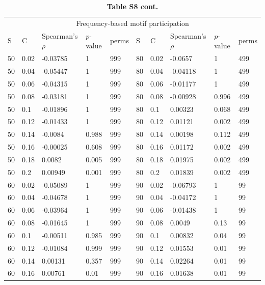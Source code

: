 \documentclass[12pt]{article}
\begin{document}
\begin{spacing}{2.0}
		\begin{table}[hb!]
			\caption*{\hspace{-13.5cm}\textbf{Table S8 cont.}}
			\footnotesize
			\begin{tabular}{l l | l l | l || ll | ll | l}
			\multicolumn{10}{c}{Frequency-based motif participation} \\
			S & C & Spearman's $\rho$ & $p$-value & perms & S & C & Spearman's $\rho$ & $p$-value & perms\\
			\hline
            50	&	0.02	&	-0.03785	&	1	&	999	&	80	&	0.02	&	-0.0657	&	1	&	499	\\
            50	&	0.04	&	-0.05447	&	1	&	999	&	80	&	0.04	&	-0.04118	&	1	&	499	\\
            50	&	0.06	&	-0.04315	&	1	&	999	&	80	&	0.06	&	-0.01177	&	1	&	499	\\
            50	&	0.08	&	-0.03181	&	1	&	999	&	80	&	0.08	&	-0.00928	&	0.996	&	499	\\
            50	&	0.1	&	-0.01896	&	1	&	999	&	80	&	0.1	&	0.00323	&	0.068	&	499	\\
            50	&	0.12	&	-0.01433	&	1	&	999	&	80	&	0.12	&	0.01121	&	0.002	&	499	\\
            50	&	0.14	&	-0.0084	&	0.988	&	999	&	80	&	0.14	&	0.00198	&	0.112	&	499	\\
            50	&	0.16	&	-0.00025	&	0.608	&	999	&	80	&	0.16	&	0.01172	&	0.002	&	499	\\
            50	&	0.18	&	0.0082	&	0.005	&	999	&	80	&	0.18	&	0.01975	&	0.002	&	499	\\
            50	&	0.2	&	0.00949	&	0.001	&	999	&	80	&	0.2	&	0.01839	&	0.002	&	499	\\
            60	&	0.02	&	-0.05089	&	1	&	999	&	90	&	0.02	&	-0.06793	&	1	&	99	\\
            60	&	0.04	&	-0.04678	&	1	&	999	&	90	&	0.04	&	-0.04172	&	1	&	99	\\
            60	&	0.06	&	-0.03964	&	1	&	999	&	90	&	0.06	&	-0.01438	&	1	&	99	\\
            60	&	0.08	&	-0.01645	&	1	&	999	&	90	&	0.08	&	0.0049	&	0.13	&	99	\\
            60	&	0.1	&	-0.00511	&	0.985	&	999	&	90	&	0.1	&	0.00832	&	0.04	&	99	\\
            60	&	0.12	&	-0.01084	&	0.999	&	999	&	90	&	0.12	&	0.01553	&	0.01	&	99	\\
            60	&	0.14	&	0.00131	&	0.357	&	999	&	90	&	0.14	&	0.02264	&	0.01	&	99	\\
            60	&	0.16	&	0.00761	&	0.01	&	999	&	90	&	0.16	&	0.01638	&	0.01	&	99	\\

\end{tabular}
\end{table}
\end{spacing}
\end{document}

